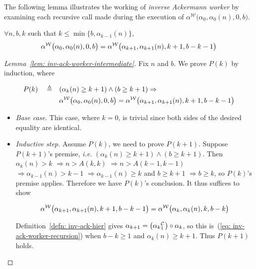 The following lemma illustrates the working of \emph{inverse Ackermann worker} by examining each recursive call made during the execution of $\alpha^{\mathcal{W}}\big(\alpha_0, \alpha_0(n), 0, b\big)$. 

\begin{lem} \label{lem: inv-ack-worker-intermediate}
	$\forall n, b, k$ such that $k\le \min\big\{b, \alpha_{k-1}(n)\big\}$, 
	\begin{equation*}
	\alpha^{\mathcal{W}}\big(\alpha_0, \alpha_0(n), 0, b\big) = \alpha^{\mathcal{W}}\big(\alpha_{k+1}, \alpha_{k+1}(n), k+1, b-k-1\big)
	\end{equation*}
\end{lem}

\begin{proof}[Lemma~\ref{lem: inv-ack-worker-intermediate}]
	Fix $n$ and $b$. We prove $P(k)$ by induction, where
	
	\begin{equation*}
	\begin{aligned}
	P(k) \quad \triangleq \quad & (\alpha_k(n)\ge k+1) \wedge (b\ge k+1) \implies \null \\ & \alpha^{\W}\big(\alpha_0, \alpha_0(n), 0, b\big) = \alpha^{\W}\big(\alpha_{k+1}, \alpha_{k+1}(n), k+1, b-k-1\big)
	\end{aligned}
	\end{equation*}
	
	\begin{itemize}[leftmargin=*]
		\item \emph{Base case}. This case, where $k = 0$, is trivial since both sides of the desired equality are identical.
		
		\item \emph{Inductive step.} Assume $P(k)$, we need to prove $P(k+1)$. Suppose $P(k+1)$'s premise, \emph{i.e.} $(\alpha_k(n)\ge k+1) \wedge (b\ge k+1)$. Then $\alpha_k(n) > k$ $\Rightarrow n > A(k, k)$ $\Rightarrow n > A(k-1, k-1)$ $\Rightarrow \alpha_{k-1}(n) > k - 1$ $\Rightarrow \alpha_{k-1}(n)\ge k$ and $b\ge k+1$ $\Rightarrow b\ge k$, so $P(k)$'s premise applies. Therefore we have $P(k)$'s conclusion. It thus suffices to show
		
		\begin{equation*}
		\alpha^{\mathcal{W}}\big(\alpha_{k+1}, \alpha_{k+1}(n), k+1, b-k-1\big)
		= \alpha^{\mathcal{W}}\big(\alpha_k, \alpha_k(n), k, b-k\big)
		\end{equation*}
		
		Definition~\ref{defn: inv-ack-hier} gives $\alpha_{k+1} = \big(\cdt{\alpha_k}{1}\big)\circ \alpha_k$, so this 
		is~(\ref{eq: inv-ack-worker-recursion}) when $b - k\ge 1$ and $\alpha_k(n)\ge k+1$. Thus $P(k+1)$ holds. 
	\end{itemize}
\end{proof}

